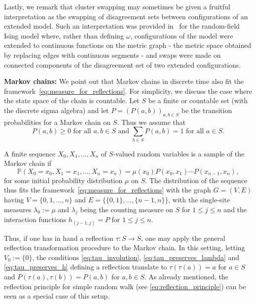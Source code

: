 \documentclass[english]{article}
\renewcommand{\P}{\mathbb{P}}
\theoremstyle{plain}
\theoremstyle{plain}
\begin{document}
Lastly, we remark that cluster swapping may sometimes be given a fruitful interpretation as the swapping of disagreement sets between configurations of an extended model. Such an interpretation was provided in~\cite{aizenman2019exponential} for the random-field Ising model where, rather than defining $\omega$, configurations of the model were extended to continuous functions on the metric graph - the metric space obtained by replacing edges with continuous segments - and swaps were made on connected components of the disagreement set of two extended configurations.

{\bf Markov chains:} We point out that Markov chains in discrete time also fit the framework~\eqref{eq:measure_for_reflections}. For simplicity, we discuss the case where the state space of the chain is countable. Let $S$ be a finite or countable set (with the discrete sigma algebra) and let $P = (P(a,b))_{a,b\in S}$ be the transition probabilities for a Markov chain on $S$. Thus we assume that
\begin{equation*}
  \text{$P(a,b)\ge 0$ for all $a,b\in S$ and $\sum_{b\in S} P(a,b) = 1$ for all $a\in S$}.
\end{equation*}

A finite sequence $X_0,X_1, \ldots, X_n$ of $S$-valued random variables is a sample of the Markov chain if
\begin{equation}\label{eq:Markov_chain_sample}
  \P(X_0 = x_0, X_1 = x_1,\ldots, X_n = x_n) = \mu(x_0)P(x_0, x_1)\cdots P(x_{n-1}, x_n),
\end{equation}
for some initial probability distribution $\mu$ on $S$. The distribution of the sequence thus fits the framework~\eqref{eq:measure_for_reflections} with the graph $G = (V,E)$ having $V = \{0,1,\ldots, n\}$ and $E = \{\{0,1\}, \ldots, \{n-1,n\}\}$, with the single-site measures $\lambda_0 := \mu$ and $\lambda_j$ being the counting measure on $S$ for $1\le j\le n$ and the interaction functions $h_{(j-1,j)} = P$ for $1\le j\le n$.

Thus, if one has in hand a reflection $\tau:S\to S$, one may apply the general reflection transformation procedure to the Markov chain. In this setting, letting $V_0 := \{0\}$, the conditions \eqref{eq:tau_involution}, \eqref{eq:tau_preserves_lambda} and \eqref{eq:tau_preserves_h} defining a reflection translate to $\tau(\tau(a)) = a$ for $a\in S$ and $P(\tau(a),\tau(b)) = P(a,b)$ for $a,b\in S$. As already mentioned, the reflection principle for simple random walk (see \eqref{eq:reflection_principle}) can be seen as a special case of this setup.
\end{document}
